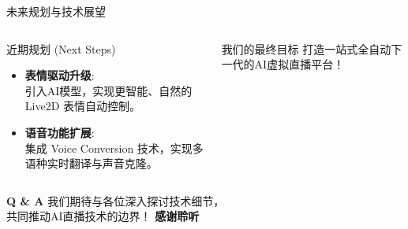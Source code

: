 \documentclass{beamer}
\begin{document}
\begin{frame}{未来规划与技术展望}
    \begin{columns}[T]
        \begin{column}{0.5\textwidth}
            \begin{exampleblock}{近期规划 (Next Steps)}
                \begin{itemize}
                    \item \textbf{表情驱动升级}: \\
                    引入AI模型，实现更智能、自然的 Live2D 表情自动控制。
                    \item \textbf{语音功能扩展}: \\
                    集成 Voice Conversion 技术，实现多语种实时翻译与声音克隆。
                \end{itemize}
            \end{exampleblock}
        \end{column}
        \begin{column}{0.5\textwidth}
            \begin{alertblock}{我们的最终目标}
                \Large
                打造一站式全自动下一代的AI虚拟直播平台！
            \end{alertblock}
        \end{column}
    \end{columns}
\end{frame}
\begin{frame}
    \centering
    \Huge{\textbf{Q \& A}}
    \vspace{2em}
    \large{我们期待与各位深入探讨技术细节，\\共同推动AI直播技术的边界！}
    \vspace{2em}
    \Large{\textbf{感谢聆听}}
\end{frame}
\end{document}
